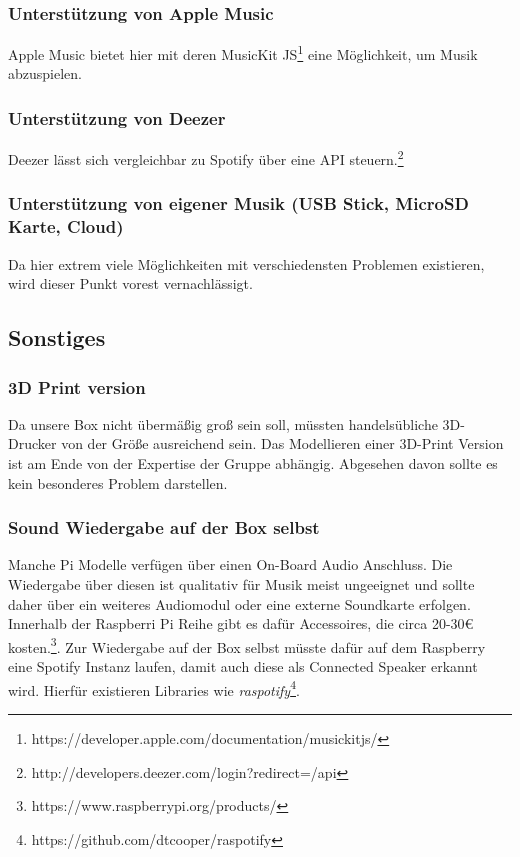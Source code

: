 \documentclass[10pt, a4paper]{article}
\begin{document}
\subsubsection{Unterstützung von Apple Music}
Apple Music bietet hier mit deren MusicKit JS\footnote{https://developer.apple.com/documentation/musickitjs/} eine Möglichkeit, um Musik abzuspielen.

\subsubsection{Unterstützung von Deezer}
Deezer lässt sich vergleichbar zu Spotify über eine API steuern.\footnote{http://developers.deezer.com/login?redirect=/api}

\subsubsection{Unterstützung von eigener Musik (USB Stick, MicroSD Karte, Cloud)}
Da hier extrem viele Möglichkeiten mit verschiedensten Problemen existieren, wird dieser Punkt vorest vernachlässigt.

\subsection{Sonstiges}
\subsubsection{3D Print version}
Da unsere Box nicht übermäßig groß sein soll, müssten handelsübliche 3D-Drucker von der Größe ausreichend sein.
Das Modellieren einer 3D-Print Version ist am Ende von der Expertise der Gruppe abhängig.
Abgesehen davon sollte es kein besonderes Problem darstellen.

\subsubsection{Sound Wiedergabe auf der Box selbst}
Manche Pi Modelle verfügen über einen On-Board Audio Anschluss.
Die Wiedergabe über diesen ist qualitativ für Musik meist ungeeignet und sollte daher über ein weiteres Audiomodul oder eine externe Soundkarte erfolgen.
Innerhalb der Raspberri Pi Reihe gibt es dafür Accessoires, die circa 20-30€ kosten.\footnote{https://www.raspberrypi.org/products/}.
Zur Wiedergabe auf der Box selbst müsste dafür auf dem Raspberry eine Spotify Instanz laufen, damit auch diese als Connected Speaker erkannt wird.
Hierfür existieren Libraries wie \textit{raspotify}\footnote{https://github.com/dtcooper/raspotify}.
\end{document}
